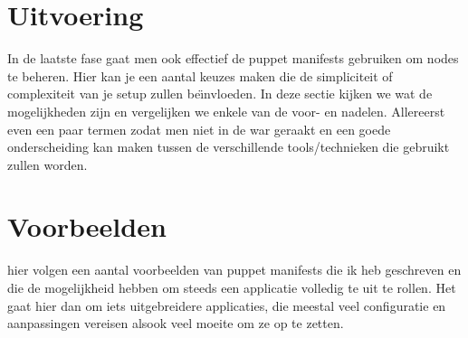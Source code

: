 \section{Uitvoering}
In de laatste fase gaat men ook effectief de puppet manifests gebruiken om nodes te beheren. Hier kan je een aantal keuzes maken die de simpliciteit of complexiteit van je setup zullen be\"{\i}nvloeden. In deze sectie kijken we wat de mogelijkheden zijn en vergelijken we enkele van de voor- en nadelen.
Allereerst even een paar termen zodat men niet in de war geraakt en een goede onderscheiding kan maken tussen de verschillende tools/technieken die gebruikt zullen worden.
 
\section{Voorbeelden}
hier volgen een aantal voorbeelden van puppet manifests die ik heb geschreven en die de mogelijkheid hebben om steeds een applicatie volledig te uit te rollen. Het gaat hier dan om iets uitgebreidere applicaties, die meestal veel configuratie en aanpassingen vereisen alsook veel moeite om ze op te zetten.

